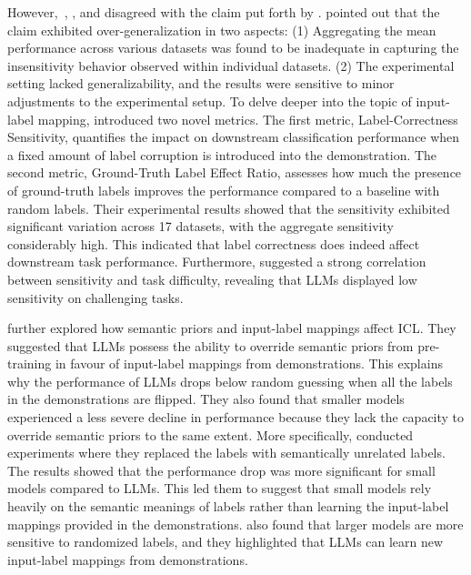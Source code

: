 However,~\citet{Kim2022GroundTruthLM}, \citet{Wei2023LargerLM}, and \citet{Kossen2023InContextLI} disagreed with the claim put forth by \citet{Min2022RethinkingTR}.
\citet{Kim2022GroundTruthLM} pointed out that the claim exhibited over-generalization in two aspects: (1) Aggregating the mean performance across various datasets was found to be inadequate in capturing the insensitivity behavior observed within individual datasets. (2) The experimental setting lacked generalizability, and the results were sensitive to minor adjustments to the experimental setup.
To delve deeper into the topic of input-label mapping, \citet{Kim2022GroundTruthLM} introduced two novel metrics.
The first metric, Label-Correctness Sensitivity, quantifies the impact on downstream classification performance when a fixed amount of label corruption is introduced into the demonstration. 
The second metric, Ground-Truth Label Effect Ratio, assesses how much the presence of ground-truth labels improves the performance compared to a baseline with random labels. 
Their experimental results showed that the sensitivity exhibited significant variation across 17 datasets, with  the aggregate sensitivity considerably high. This indicated that label correctness does indeed affect downstream task performance.
Furthermore, \citet{Kim2022GroundTruthLM} suggested a strong correlation between sensitivity and task difficulty, revealing that LLMs displayed low sensitivity on challenging tasks.

\citet{Wei2023LargerLM} further explored how semantic priors and input-label mappings affect ICL.
They suggested that LLMs possess the ability to override semantic priors from pre-training in favour of input-label mappings from demonstrations. This explains why the performance of LLMs drops below random guessing when all the labels in the demonstrations are flipped.
They also found that smaller models experienced a less severe decline in performance because they lack the capacity to override semantic priors to the same extent.
More specifically, \citet{Wei2023LargerLM} conducted experiments where they replaced the labels with semantically unrelated labels. The results showed that the performance drop was more significant for small models compared to LLMs.
This led them to suggest that small models rely heavily on the semantic meanings of labels rather than learning the input-label mappings provided in the demonstrations.
\citet{Kossen2023InContextLI} also found that larger models are more sensitive to randomized labels, and they highlighted that LLMs can learn new input-label mappings from  demonstrations.
 
